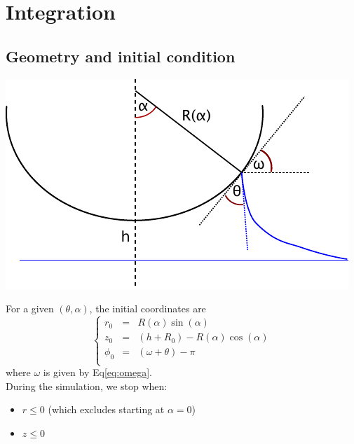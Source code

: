 \documentclass[aps,onecolumn]{revtex4}
\begin{document}
\section{Integration}

\subsection{Geometry and initial condition}

\begin{center}
\includegraphics{geometry.pdf}
\end{center}

For a given $(\theta,\alpha)$, the initial coordinates are
\begin{equation}
\left\lbrace
\begin{array}{rcl}
	r_0    & = & R(\alpha) \sin(\alpha)\\
	z_0    & = & (h + R_0) - R(\alpha) \cos(\alpha)\\
	\phi_0 & = & \left(\omega + \theta\right) - \pi\\
\end{array}
\right. 
\end{equation}
where $\omega$ is given by Eq\eqref{eq:omega}.\\

During the simulation, we stop when:
\begin{itemize}
\item $r\leq0$ (which excludes starting at $\alpha=0$)
\item $z\leq0$
\end{itemize}
\end{document}
